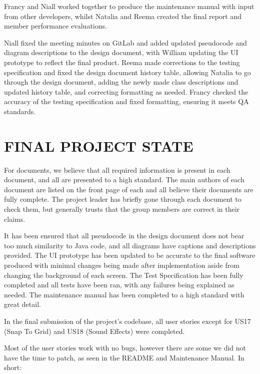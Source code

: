\documentclass[a4paper]{project}
\begin{document}
			Francy and Niall worked together to produce the maintenance manual with input from other developers, whilst Natalia and Reema created the final report and member performance evaluations.
			
			Niall fixed the meeting minutes on GitLab and added updated pseudocode and diagram descriptions to the design document, with William updating the UI prototype to reflect the final product. Reema made corrections to the testing specification and fixed the design document history table, allowing Natalia to go through the design document, adding the newly made class descriptions and updated history table, and correcting formatting as needed. Francy checked the accuracy of the testing specification and fixed formatting, ensuring it meets QA standards.
	
	\section{FINAL PROJECT STATE}\label{sec:final-project-state}
	
		For documents, we believe that all required information is present in each document, and all are presented to a high standard. The main authors of each document are listed on the front page of each and all believe their documents are fully complete. The project leader has briefly gone through each document to check them, but generally trusts that the group members are correct in their claims.
		
		It has been ensured that all pseudocode in the design document does not bear too much similarity to Java code, and all diagrams have captions and descriptions provided. The UI prototype has been updated to be accurate to the final software produced with minimal changes being made after implementation aside from changing the background of each screen. The Test Specification has been fully completed and all tests have been ran, with any failures being explained as needed. The maintenance manual has been completed to a high standard with great detail.
	
		In the final submission of the project's codebase, all user stories except for US17 (Snap To Grid) and US18 (Sound Effects) were completed.
		
		Most of the user stories work with no bugs, however there are some we did not have the time to patch, as seen in the README and Maintenance Manual. In short:
		
\end{document}
